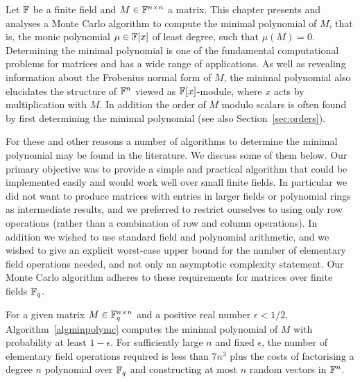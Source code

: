 Let $\mathbb{F}$ be a finite field and $M \in \mathbb{F}^{n \times n}$ a matrix. This
chapter presents and analyses a Monte Carlo  algorithm to compute the minimal 
polynomial of $M$, that is,
the monic polynomial $\mu \in \mathbb{F}[x]$ of least degree, such that
$\mu(M) = 0$. 
Determining the minimal polynomial is one of the fundamental computational
problems for matrices and has a wide range of applications. As well as 
revealing information about the Frobenius
normal form of $M$, the minimal polynomial also elucidates the structure 
of $\mathbb{F}^n$ viewed as $\mathbb{F}[x]$-module, where $x$ acts by multiplication with $M$. 
In addition the order of $M$ modulo scalars is often found by first 
determining the minimal polynomial (see also Section~\ref{sec:orders}). 

For these and other reasons a number of algorithms to determine the 
minimal polynomial may be found in the literature. We discuss some 
of them below. Our primary objective 
was to provide a simple and practical algorithm that could be 
implemented easily and would work well over small finite fields. In
particular we did not want to produce matrices with entries in 
larger fields or polynomial rings as intermediate results, 
and we preferred to restrict ourselves to using only row operations 
(rather than a combination of row and column operations). 
In addition we wished to use standard field and polynomial arithmetic,
and we wished to give  an explicit worst-case upper bound
for the number of elementary field operations needed, and not only an
asymptotic complexity statement.
Our Monte Carlo algorithm adheres to these requirements for matrices 
over finite fields $\mathbb{F}_q$.

\begin{Theo}\label{main}
For a given matrix $M \in \mathbb{F}_q^{n \times n}$ and a positive 
real number $\epsilon < 1/2$, Algorithm~\ref{algminpolymc}
computes the minimal polynomial of $M$ with probability at least $1-\epsilon$.
For sufficiently large $n$ and fixed $\epsilon$, the number of elementary 
field operations required is less than $7n^3$ plus the costs of 
factorising a degree $n$ polynomial over $\mathbb{F}_q$ and constructing at most $n$
random vectors in $\mathbb{F}^n$.
\end{Theo}

